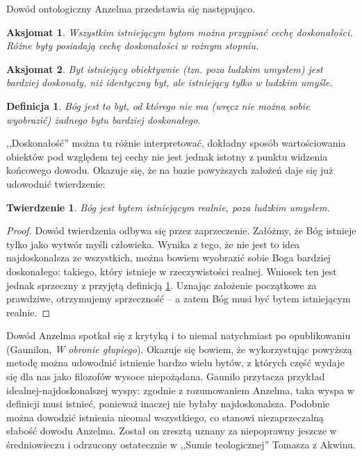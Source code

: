 \documentclass[runningheads]{llncs}
\newtheorem{theorem-pl}{Twierdzenie}
\newtheorem{definition-pl}{Definicja}
\newtheorem{axiom-pl}{Aksjomat}
\begin{document}
Dowód ontologiczny Anzelma przedstawia się następująco. 
\begin{axiom-pl} \label{axiom:anzelm1}
	Wszystkim istniejącym bytom można przypisać cechę \emph{doskonałości}. Różne byty posiadają cechę doskonałości w rożnym stopniu. 
\end{axiom-pl}
\begin{axiom-pl} \label{axiom:anzelm2}
	Byt istniejący obiektywnie (tzn. poza ludzkim umysłem) jest bardziej doskonały, niż identyczny byt, ale istniejący tylko w ludzkim umyśle. 
\end{axiom-pl}
\begin{definition-pl} \label{def:anzelm-god}
	Bóg jest to byt, od którego nie ma (wręcz nie można sobie wyobrazić) żadnego bytu bardziej doskonałego. 
\end{definition-pl}
\noindent,,Doskonałość'' można tu różnie interpretować, dokładny sposób wartościowania obiektów pod względem tej cechy nie jest jednak istotny z punktu widzenia końcowego dowodu. Okazuje się, że na bazie powyższych założeń daje się już udowodnić twierdzenie:
\begin{theorem-pl} \label{theorem:anzelm-god}
	Bóg jest bytem istniejącym realnie, poza ludzkim umysłem. 
\end{theorem-pl}
\begin{proof}
	Dowód twierdzenia odbywa się przez zaprzeczenie. Załóżmy, że Bóg istnieje tylko jako wytwór myśli człowieka. Wynika z tego, że nie jest to idea najdoskonalsza ze wszystkich, można bowiem wyobrazić sobie Boga bardziej doskonałego: takiego, który istnieje w rzeczywistości realnej. Wniosek ten jest jednak sprzeczny z przyjętą definicją \ref{def:anzelm-god}. Uznając założenie początkowe za prawdziwe, otrzymujemy sprzeczność -- a zatem Bóg musi być bytem istniejącym realnie. 
\end{proof}
Dowód Anzelma spotkał się z krytyką i to niemal natychmiast po opublikowaniu (Gaunilon, \textit{W obronie głupiego}). Okazuje się bowiem, że wykorzystując powyższą metodę można udowodnić istnienie bardzo wielu bytów, z których część wydaje się dla nas jako filozofów wysoce niepożądana. Gaunilo przytacza przykład idealnej-najdoskonalszej wyspy: zgodnie z rozumowaniem Anzelma, taka wyspa w definicji musi istnieć, ponieważ inaczej nie byłaby najdoskonalsza. Podobnie można dowodzić istnienia nieomal wszystkiego, co stanowi niezaprzeczalną słabość dowodu Anzelma. Został on zresztą uznany za niepoprawny jeszcze w średniowieczu i odrzucony ostatecznie w ,,Sumie teologicznej'' Tomasza z Akwinu. 
\end{document}
